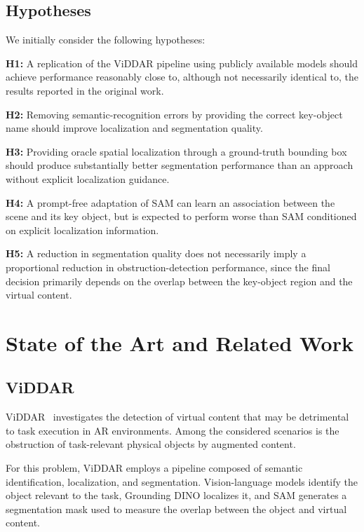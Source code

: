 \documentclass[conference]{IEEEtran}
\begin{document}
\subsection{Hypotheses}

We initially consider the following hypotheses:

\textbf{H1:} A replication of the ViDDAR pipeline using publicly available models should achieve performance reasonably close to, although not necessarily identical to, the results reported in the original work.

\textbf{H2:} Removing semantic-recognition errors by providing the correct key-object name should improve localization and segmentation quality.

\textbf{H3:} Providing oracle spatial localization through a ground-truth bounding box should produce substantially better segmentation performance than an approach without explicit localization guidance.

\textbf{H4:} A prompt-free adaptation of SAM can learn an association between the scene and its key object, but is expected to perform worse than SAM conditioned on explicit localization information.

\textbf{H5:} A reduction in segmentation quality does not necessarily imply a proportional reduction in obstruction-detection performance, since the final decision primarily depends on the overlap between the key-object region and the virtual content.



\section{State of the Art and Related Work}

\subsection{ViDDAR}

ViDDAR~\cite{viddar} investigates the detection of virtual content that may be detrimental to task execution in AR environments. Among the considered scenarios is the obstruction of task-relevant physical objects by augmented content.

For this problem, ViDDAR employs a pipeline composed of semantic identification, localization, and segmentation. Vision-language models identify the object relevant to the task, Grounding DINO localizes it, and SAM generates a segmentation mask used to measure the overlap between the object and virtual content.
\end{document}
